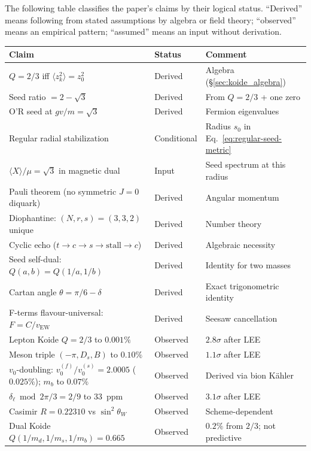 \documentclass[12pt,a4paper]{article}
\begin{document}
The following table classifies the paper's claims by their logical
status.  ``Derived'' means following from stated assumptions by
algebra or field theory; ``observed'' means an empirical pattern;
``assumed'' means an input without derivation.

\begin{center}
\small
\begin{tabular}{lll}
\toprule
Claim & Status & Comment \\
\midrule
$Q = 2/3$ iff $\langle z_k^2\rangle = z_0^2$ & Derived & Algebra (\S\ref{sec:koide_algebra}) \\
Seed ratio $= 2-\sqrt{3}$ & Derived & From $Q = 2/3$ + one zero \\
O'R seed at $gv/m = \sqrt{3}$ & Derived & Fermion eigenvalues \\
Regular radial stabilization & Conditional & Radius $s_0$ in Eq.~\eqref{eq:regular-seed-metric} \\
$\langle X\rangle/\mu = \sqrt{3}$ in magnetic dual & Input & Seed spectrum at this radius \\
Pauli theorem (no symmetric $J{=}0$ diquark) & Derived & Angular momentum \\
Diophantine: $(N,r,s) = (3,3,2)$ unique & Derived & Number theory \\
Cyclic echo ($t \to c \to s \to \text{stall} \to c$) & Derived & Algebraic necessity \\
Seed self-dual: $Q(a,b) = Q(1/a,1/b)$ & Derived & Identity for two masses \\
Cartan angle $\theta = \pi/6 - \delta$ & Derived & Exact trigonometric identity \\
F-terms flavour-universal: $F = C/v_{\text{EW}}$ & Derived & Seesaw cancellation \\
\midrule
Lepton Koide $Q = 2/3$ to $0.001\%$ & Observed & $2.8\sigma$ after LEE \\
Meson triple $(-\pi,D_s,B)$ to $0.10\%$ & Observed & $1.1\sigma$ after LEE \\
$v_0$-doubling: $v_0^{(f)}/v_0^{(s)} = 2.0005$ ($0.025\%$); $m_b$ to $0.07\%$ & Observed & Derived via bion K\"ahler \\
$\delta_\ell \bmod 2\pi/3 = 2/9$ to 33~ppm & Observed & $3.1\sigma$ after LEE \\
Casimir $R = 0.22310$ vs $\sin^2\theta_W$ & Observed & Scheme-dependent \\
Dual Koide $Q(1/m_d,1/m_s,1/m_b) = 0.665$ & Observed & $0.2\%$ from $2/3$; not predictive \\

\end{tabular}
\end{center}
\end{document}
